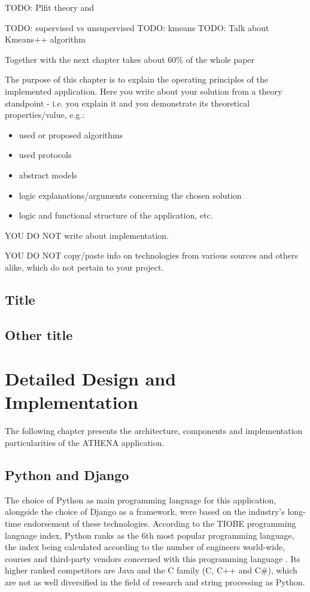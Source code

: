 \documentclass[12pt,a4paper,twoside]{report}
\begin{document}
\label{plfittheory}
TODO: Plfit theory and \cite{clauset2009power}

TODO: supervised vs unsupervised
TODO: kmeans
\label{kmeansplusplus}
TODO: Talk about Kmeans++ algorithm


Together with the next chapter takes about 60\% of the whole paper

The purpose of this chapter is to explain the operating principles of the implemented application.
Here you write about your solution from a theory standpoint - i.e. you explain it and you demonstrate its theoretical properties/value, e.g.:
\begin{itemize}
 \item used or proposed algorithms
 \item used protocols
 \item abstract models
 \item logic explanations/arguments concerning the chosen solution
 \item logic and functional structure of the application, etc.
\end{itemize}

{\color{red} YOU DO NOT write about implementation.

YOU DO NOT copy/paste info on technologies from various sources and others alike, which do not pertain to your project.
}

\section{Title}
\section{Other title}


\chapter{Detailed Design and Implementation}
The following chapter presents the architecture, components and implementation particularities of the ATHENA application.

\section{Python and Django}
The choice of Python as main programming language for this application, alongside the choice of Django as a framework, were based on the industry's long-time endorsement of these technologies. According to the TIOBE programming language index, Python ranks as the 6th most popular programming language, the index being calculated according to the number of engineers world-wide, courses and third-party vendors concerned with this programming language \cite{tiobeindex}. Its higher ranked competitors are Java and the C family (C, C++ and C\#), which are not as well diversified in the field of research and string processing as Python.
\end{document}
